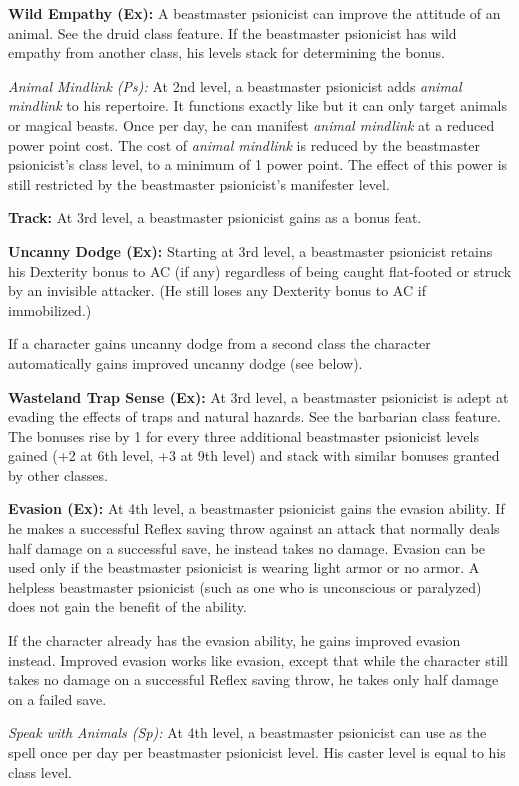 {\textbf{Wild Empathy (Ex):} A beastmaster psionicist can improve the attitude of an animal. See the druid class feature. If the beastmaster psionicist has wild empathy from another class, his levels stack for determining the bonus.

\textit{Animal Mindlink (Ps):} At 2nd level, a beastmaster psionicist adds \emph{animal mindlink} to his repertoire. It functions exactly like  but it can only target animals or magical beasts. Once per day, he can manifest \emph{animal mindlink} at a reduced power point cost. The cost of \emph{animal mindlink} is reduced by the beastmaster psionicist's class level, to a minimum of 1 power point. The effect of this power is still restricted by the beastmaster psionicist's manifester level.

\textbf{Track:} At 3rd level, a beastmaster psionicist gains  as a bonus feat.

\textbf{Uncanny Dodge (Ex):} Starting at 3rd level, a beastmaster psionicist retains his Dexterity bonus to AC (if any) regardless of being caught flat-footed or struck by an invisible attacker. (He still loses any Dexterity bonus to AC if immobilized.)

If a character gains uncanny dodge from a second class the character automatically gains improved uncanny dodge (see below).

\textbf{Wasteland Trap Sense (Ex):} At 3rd level, a beastmaster psionicist is adept at evading the effects of traps and natural hazards. See the barbarian class feature. The bonuses rise by 1 for every three additional beastmaster psionicist levels gained (+2 at 6th level, +3 at 9th level) and stack with similar bonuses granted by other classes.

\textbf{Evasion (Ex):} At 4th level, a beastmaster psionicist gains the evasion ability. If he makes a successful Reflex saving throw against an attack that normally deals half damage on a successful save, he instead takes no damage. Evasion can be used only if the beastmaster psionicist is wearing light armor or no armor. A helpless beastmaster psionicist (such as one who is unconscious or paralyzed) does not gain the benefit of the ability.

If the character already has the evasion ability, he gains improved evasion instead. Improved evasion works like evasion, except that while the character still takes no damage on a successful Reflex saving throw, he takes only half damage on a failed save.

\textit{Speak with Animals (Sp):} At 4th level, a beastmaster psionicist can use  as the spell once per day per beastmaster psionicist level. His caster level is equal to his class level.

}
